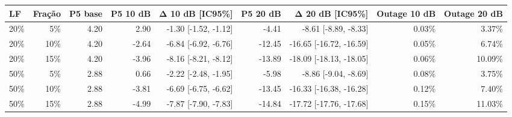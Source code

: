 \begin{tabular}{lrrrrrrrr}
\toprule
LF & Fração & P5 base & P5 10 dB & Δ 10 dB [IC95\%] & P5 20 dB & Δ 20 dB [IC95\%] & Outage 10 dB & Outage 20 dB \\
\midrule
20\% & 5\% & 4.20 & 2.90 & -1.30 [-1.52, -1.12] & -4.41 & -8.61 [-8.89, -8.33] & 0.03\% & 3.37\% \\
20\% & 10\% & 4.20 & -2.64 & -6.84 [-6.92, -6.76] & -12.45 & -16.65 [-16.72, -16.59] & 0.05\% & 6.74\% \\
20\% & 15\% & 4.20 & -3.96 & -8.16 [-8.21, -8.12] & -13.89 & -18.09 [-18.13, -18.05] & 0.06\% & 10.09\% \\
50\% & 5\% & 2.88 & 0.66 & -2.22 [-2.48, -1.95] & -5.98 & -8.86 [-9.04, -8.69] & 0.08\% & 3.75\% \\
50\% & 10\% & 2.88 & -3.81 & -6.69 [-6.75, -6.62] & -13.45 & -16.33 [-16.38, -16.28] & 0.12\% & 7.40\% \\
50\% & 15\% & 2.88 & -4.99 & -7.87 [-7.90, -7.83] & -14.84 & -17.72 [-17.76, -17.68] & 0.15\% & 11.03\% \\
\bottomrule
\end{tabular}
